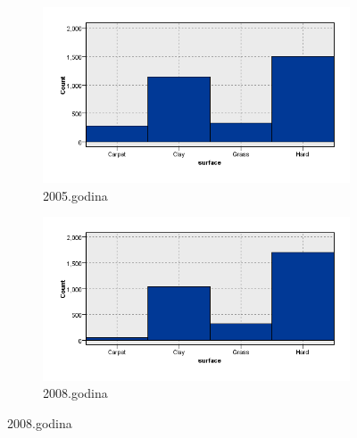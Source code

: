 \documentclass[a4paper]{article}
\begin{document}
\begin{figure}[H]
	\begin{subfigure}[h]{0.35\textwidth}
		\begin{center}
			\includegraphics[scale=0.30]{Klasifikacija/HistogramiPodlogaTerena/Graphboard2005.png}
		\end{center}
		\caption{2005.godina}
		\label{fig:Podloga2005}
	\end{subfigure}
	\hspace{1.5cm}
	\begin{subfigure}[h]{0.35\textwidth}
		\begin{center}
			\includegraphics[scale=0.30]{Klasifikacija/HistogramiPodlogaTerena/Graphboard2008.png}
		\end{center}
		\caption{2008.godina}
		\label{fig:Podloga2008}
	\end{subfigure}


\end{figure}
\end{document}
